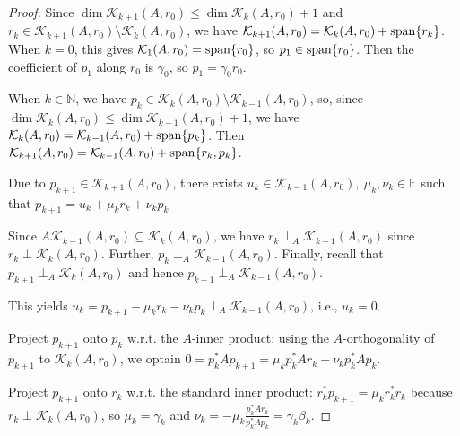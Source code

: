 \documentclass[12pt]{article}
\theoremstyle{definition}
\theoremstyle{remark}
\numberwithin{equation}{section}
\newcommand{\F}{\mathbb{F}}
\newcommand{\N}{\mathbb{N}}
\newcommand{\K}{\mathcal{K}}
\DeclarePairedDelimiter{\set}{\{}{\}}
\DeclareMathOperator{\mathspan}{span}
\begin{document}
\begin{proof}
  Since $\dim \K_{k+1}(A,r_0) \leq \dim \K_k(A,r_0) + 1$ and $r_k \in \K_{k+1}(A,r_0) \setminus \K_k(A,r_0)$, we have $\K_{k+1}(A,r_0) = \K_k(A,r_0) + \mathspan \set{r_k}$. When $k = 0$, this gives $\K_1(A,r_0) = \mathspan \set{r_0}$, so $p_1 \in \mathspan \set{r_0}$. Then the coefficient of $p_1$ along $r_0$ is $\gamma_0$, so $p_1 = \gamma_0 r_0$.

  When $k \in \N$, we have $p_k \in \mathcal{K}_k(A,r_0) \setminus \mathcal{K}_{k-1}(A,r_0)$, so, since $\dim \K_k(A,r_0) \leq \dim \K_{k-1}(A,r_0) + 1$, we have $\K_k(A,r_0) = \K_{k-1}(A,r_0) + \mathspan \set{p_k}$. Then $\K_{k+1}(A,r_0) = \K_{k-1}(A,r_0) + \mathspan \set{r_k, p_k}$.

  Due to $p_{k+1} \in \K_{k+1}(A,r_0)$, there exists $u_k \in \K_{k-1}(A,r_0),\ \mu_k, \nu_k \in \F$ such that $p_{k+1} = u_k + \mu_k r_k + \nu_k p_k$

  Since $A \K_{k-1}(A,r_0) \subseteq \K_k(A,r_0)$, we have $r_k \perp_A \K_{k-1}(A,r_0)$ since $r_k \perp \K_k(A,r_0)$. Further, $p_k \perp_A \K_{k-1}(A,r_0)$. Finally, recall that $p_{k+1} \perp_A \K_k(A,r_0)$ and hence $p_{k+1} \perp_A \K_{k-1}(A,r_0)$.

  This yields $u_k = p_{k+1} - \mu_k r_k - \nu_k p_k \perp_A \K_{k-1}(A,r_0)$, i.e., $u_k = 0$.

  Project $p_{k+1}$ onto $p_k$ w.r.t. the $A$-inner product: using the $A$-orthogonality of $p_{k+1}$ to $\K_k(A,r_0)$, we optain $0 = p_k^* A p_{k+1} = \mu_k p_k^* A r_k + \nu_k p_k^* A p_k$.

  Project $p_{k+1}$ onto $r_k$ w.r.t. the standard inner product: $r_k^* p_{k+1} = \mu_k r_k^* r_k$ because $r_k \perp \K_k(A,r_0)$, so $\mu_k = \gamma_k$ and $\nu_k = - \mu_k \frac{p_k^* A r_k}{p_k^* A p_k} = \gamma_k \beta_k$.
\end{proof}
\end{document}
